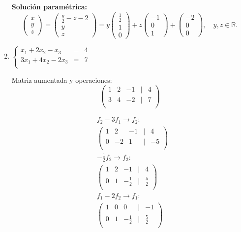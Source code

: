 \begin{prob}
\begin{enumerate}[$a)$]
\begin{myproof}
    \textbf{Solución paramétrica:}
    \[
    \begin{pmatrix} x \\ y \\ z \end{pmatrix} = 
    \begin{pmatrix} \frac{y}{2} - z - 2 \\ y \\ z \end{pmatrix} = 
    y \begin{pmatrix} \frac{1}{2} \\ 1 \\ 0 \end{pmatrix} + 
    z \begin{pmatrix} -1 \\ 0 \\ 1 \end{pmatrix} + 
    \begin{pmatrix} -2 \\ 0 \\ 0 \end{pmatrix}, \quad y,z \in \mathbb{R}.
    \]
    \end{myproof}

 \item  $\left\lbrace \begin{array}{ccc}
x_1+2x_2-x_3&=&4\\
3x_1+4x_2-2x_3&=&7\\
\end{array} \right. $ 
    
    \begin{myproof}
    Matriz aumentada y operaciones:
    \[
    \begin{pmatrix}
    1 & 2 & -1 & | & 4 \\
    3 & 4 & -2 & | & 7 \\
    \end{pmatrix}
    \]
    
    \begin{align*}
    &f_2 - 3f_1 \to f_2: \\
    &\begin{pmatrix}
    1 & 2 & -1 & | & 4 \\
    0 & -2 & 1 & | & -5 \\
    \end{pmatrix} \\
    &-\frac{1}{2}f_2\to f_2: \\
    &\begin{pmatrix}
    1 & 2 & -1 & | & 4 \\
    0 & 1 & -\frac{1}{2} & | & \frac{5}{2} \\
    \end{pmatrix} \\
    &f_1 - 2f_2\to f_1: \\
    &\begin{pmatrix}
    1 & 0 & 0 & | & -1 \\
    0 & 1 & -\frac{1}{2} & | & \frac{5}{2} \\
    \end{pmatrix}
    \end{align*}
    

\end{myproof}
\end{enumerate}
\end{prob}
